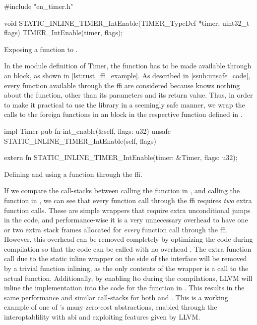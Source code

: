 \begin{listing}[h]
\begin{ccode}
#include "en_timer.h"

void STATIC_INLINE_TIMER_IntEnable(TIMER_TypeDef *timer,
                                   uint32_t flags) {
  TIMER_IntEnable(timer, flags);
}
\end{ccode}
\caption{Exposing a  function to {\rust}.}
\label{lst:exposing_static_inline}
\end{listing}

In the {\rust} module definition of Timer, the function has to be made available through an  block, as shown in \autoref{lst:rust_ffi_example}.
As described in \autoref{ssub:unsafe_code}, every function available through the \gls{ffi} are considered {\unsafe} because {\rust} knows nothing about the function, other than its parameters and its return value.
Thus, in order to make it practical to use the library in a seemingly safe manner, we wrap the calls to the foreign functions in an {\unsafe} block in the respective function defined in {\rust}.

\begin{listing}[h]
\begin{rustcode}
impl Timer {
  pub fn int_enable(&self, flags: u32) {
    unsafe { STATIC_INLINE_TIMER_IntEnable(self, flags) }
  }
}

extern {
  fn STATIC_INLINE_TIMER_IntEnable(timer: &Timer, flags: u32);
}
\end{rustcode}
\caption{Defining and using a function through the {\rust} \gls{ffi}.}
\label{lst:rust_ffi_example}
\end{listing}

If we compare the call-stacks between calling the  function in {\rust}, and calling the  function in {\C}, we can see that every function call through the \gls{ffi} requires \emph{two} extra function calls.
These are simple wrappers that require extra unconditional jumps in the code, and performance-wise it is a very unnecessary overhead to have one or two extra stack frames allocated for \emph{every} function call through the \gls{ffi}.
However, this overhead can be removed completely by optimizing the code during compilation so that the {\C} code can be called with no overhead \cite{web:rust_once_run_everywhere}.
The extra function call due to the static inline wrapper on the {\C} side of the interface will be removed by a trivial function inlining, as the only contents of the wrapper is a call to the actual function.
Additionally, by enabling \gls{lto} during the compilations, LLVM will inline the {\C} implementation into the code for the  function in {\rust}.
This results in the same performance and similar call-stacks for both {\C} and {\rust}.
This is a working example of one of {\rust}'s many zero-cost abstractions, enabled through the interoptablility with {\C} \gls{abi} and exploiting features given by LLVM.


